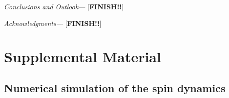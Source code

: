\documentclass[prl,aps,twocolumn,showpacs,superscriptaddress,longbibliography]{revtex4-1}
\begin{document}
\emph{Conclusions and Outlook---} [{\bf FINISH!!}]

\emph{Acknowledgments---} [{\bf FINISH!!}]



%
\section{Supplemental Material}


\subsection{Numerical simulation of the spin dynamics}
\end{document}
